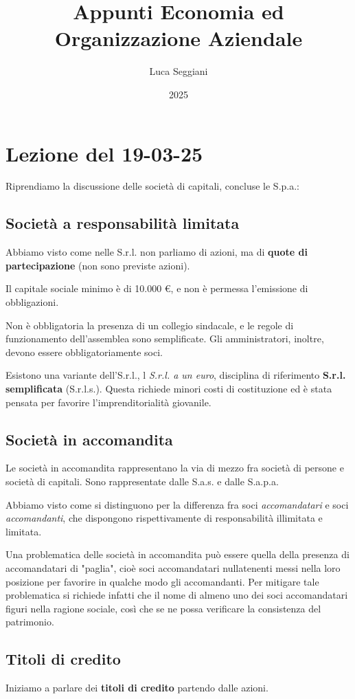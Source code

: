\documentclass[a4paper,11pt]{article}
\title{Appunti Economia ed Organizzazione Aziendale}
\author{Luca Seggiani}
\date{2025}
\begin{document}
\section{Lezione del 19-03-25}

\thispagestyle{empty}
\pagestyle{fancy}

Riprendiamo la discussione delle società di capitali, concluse le S.p.a.:

\subsection{Società a responsabilità limitata}
Abbiamo visto come nelle S.r.l. non parliamo di azioni, ma di \textbf{quote di partecipazione} (non sono previste azioni).

Il capitale sociale minimo è di 10.000 €, e non è permessa l'emissione di obbligazioni.

Non è obbligatoria la presenza di un collegio sindacale, e le regole di funzionamento dell'assemblea sono semplificate.
Gli amministratori, inoltre, devono essere obbligatoriamente soci.

Esistono una variante dell'S.r.l., l \textit{S.r.l. a un euro}, disciplina di riferimento \textbf{S.r.l. semplificata} (S.r.l.s.).
Questa richiede minori costi di costituzione ed è stata pensata per favorire l'imprenditorialità giovanile.

\subsection{Società in accomandita}
Le società in accomandita rappresentano la via di mezzo fra società di persone e società di capitali.
Sono rappresentate dalle S.a.s. e dalle S.a.p.a.

Abbiamo visto come si distinguono per la differenza fra soci \textit{accomandatari} e soci \textit{accomandanti}, che dispongono rispettivamente di responsabilità illimitata e limitata.

Una problematica delle società in accomandita può essere quella della presenza di accomandatari di "paglia", cioè soci accomandatari nullatenenti messi nella loro posizione per favorire in qualche modo gli accomandanti. 
Per mitigare tale problematica si richiede infatti che il nome di almeno uno dei soci accomandatari figuri nella ragione sociale, così che se ne possa verificare la consistenza del patrimonio.

\subsection{Titoli di credito}
Iniziamo a parlare dei \textbf{titoli di credito} partendo dalle azioni.
\end{document}
